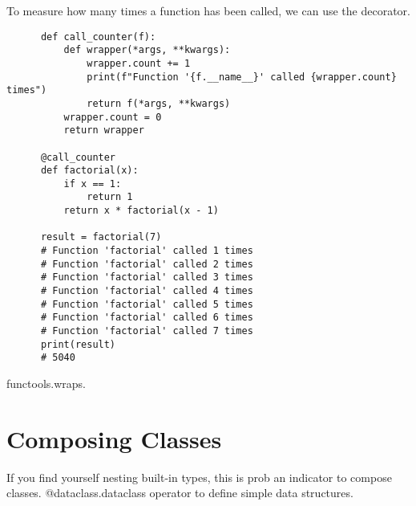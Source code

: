 \documentclass{article}
\begin{document}
  \begin{example}
    To measure how many times a function has been called, we can use the decorator. 
    \begin{lstlisting}
      def call_counter(f):
          def wrapper(*args, **kwargs):
              wrapper.count += 1
              print(f"Function '{f.__name__}' called {wrapper.count} times")
              return f(*args, **kwargs)
          wrapper.count = 0
          return wrapper

      @call_counter
      def factorial(x): 
          if x == 1: 
              return 1 
          return x * factorial(x - 1)

      result = factorial(7)
      # Function 'factorial' called 1 times
      # Function 'factorial' called 2 times
      # Function 'factorial' called 3 times
      # Function 'factorial' called 4 times
      # Function 'factorial' called 5 times
      # Function 'factorial' called 6 times
      # Function 'factorial' called 7 times
      print(result)       
      # 5040
    \end{lstlisting}
  \end{example}

  functools.wraps. 

\section{Composing Classes}

  If you find yourself nesting built-in types, this is prob an indicator to compose classes. @dataclass.dataclass operator to define simple data structures. 
\end{document}
